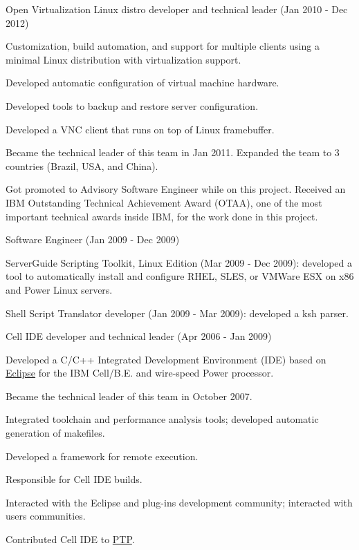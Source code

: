 \documentclass[10pt]{article} %
\begin{document}
\job
{Open Virtualization Linux distro developer and technical leader (Jan 2010 - Dec 2012)}
{Customization, build automation, and support for multiple clients using a minimal Linux distribution with virtualization support.

\begin{itemize-noindent}
\item{Developed automatic configuration of virtual machine hardware.}
\item{Developed tools to backup and restore server configuration.}
\item{Developed a VNC client that runs on top of Linux framebuffer.}
\item{Became the technical leader of this team in Jan 2011. Expanded the team to 3 countries (Brazil, USA, and China).}
\item{Got promoted to Advisory Software Engineer while on this project. Received an IBM Outstanding Technical Achievement Award (OTAA), one of the most important technical awards inside IBM, for the work done in this project.}
\end{itemize-noindent}

}
\job
{Software Engineer (Jan 2009 - Dec 2009)}
{

\begin{itemize-noindent}
\item{ServerGuide Scripting Toolkit, Linux Edition (Mar 2009 - Dec 2009): developed a tool to automatically install and configure RHEL, SLES, or VMWare ESX on x86 and Power Linux servers.}
\item{Shell Script Translator developer (Jan 2009 - Mar 2009): developed a ksh parser.}
\end{itemize-noindent}

}
\job
{Cell IDE developer and technical leader (Apr 2006 - Jan 2009)}
{Developed a C/C++ Integrated Development Environment (IDE) based on \href{https://eclipse.org/}{Eclipse} for the IBM Cell/B.E. and wire-speed Power processor.

\begin{itemize-noindent}
\item{Became the technical leader of this team in October 2007.}
\item{Integrated toolchain and performance analysis tools; developed automatic generation of makefiles.}
\item{Developed a framework for remote execution.}
\item{Responsible for Cell IDE builds.}
\item{Interacted with the Eclipse and plug-ins development community; interacted with users communities.}
\item{Contributed Cell IDE to \href{http://www.eclipse.org/ptp/}{PTP}.}
\end{itemize-noindent}

}
\end{document}
